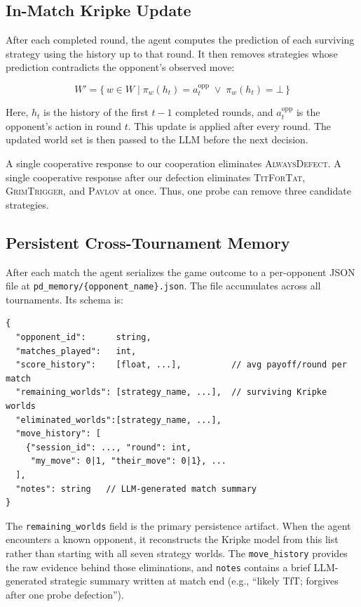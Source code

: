 \documentclass[11pt]{article}
\begin{document}
\subsection{In-Match Kripke Update}

After each completed round, the agent computes the prediction of each surviving strategy using
the history up to that round. It then removes strategies whose prediction contradicts the
opponent's observed move:

\[
W' = \{\, w \in W \mid \pi_w(h_t) = a^{\text{opp}}_t \;\vee\; \pi_w(h_t) = \bot \,\}
\]

Here, $h_t$ is the history of the first $t-1$ completed rounds, and $a^{\text{opp}}_t$ is the
opponent's action in round $t$. This update is applied after every round. The updated world
set is then passed to the LLM before the next decision.

A single cooperative response to our cooperation eliminates \textsc{AlwaysDefect}. A single
cooperative response after our defection eliminates \textsc{TitForTat}, \textsc{GrimTrigger},
and \textsc{Pavlov} at once. Thus, one probe can remove three candidate strategies.

\subsection{Persistent Cross-Tournament Memory}
\label{sec:memory}

After each match the agent serializes the game outcome to a per-opponent JSON file at
\texttt{pd\_memory/\{opponent\_name\}.json}. The file accumulates across all tournaments.
Its schema is:

\begin{lstlisting}
{
  "opponent_id":      string,
  "matches_played":   int,
  "score_history":    [float, ...],          // avg payoff/round per match
  "remaining_worlds": [strategy_name, ...],  // surviving Kripke worlds
  "eliminated_worlds":[strategy_name, ...],
  "move_history": [
    {"session_id": ..., "round": int,
     "my_move": 0|1, "their_move": 0|1}, ...
  ],
  "notes": string   // LLM-generated match summary
}
\end{lstlisting}

The \texttt{remaining\_worlds} field is the primary persistence artifact. When the agent
encounters a known opponent, it reconstructs the Kripke model from this list rather than
starting with all seven strategy worlds. The \texttt{move\_history} provides the raw evidence
behind those eliminations, and \texttt{notes} contains a brief LLM-generated strategic
summary written at match end (e.g., ``likely TfT; forgives after one probe defection'').
\end{document}
